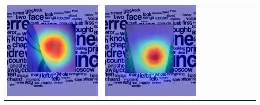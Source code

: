 \begin{landscape}
\begin{table}[]
\begin{tabular}{@{}c c c c c c c c c c@{}}
			\includegraphics[width=.12\textheight ,keepaspectratio]{images/pretraining/gradcam/3/EfficientNetB5CombinedGradCam.png} &
			\includegraphics[width=.12\textheight ,keepaspectratio]{images/pretraining/gradcam/9/EfficientNetB5CombinedGradCam.png} &

\end{tabular}
\end{table}
\end{landscape}
